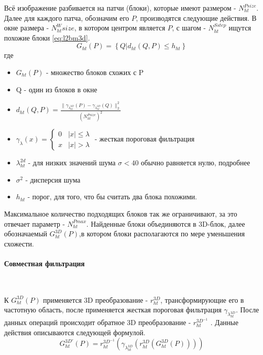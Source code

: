 Всё изображение разбивается на патчи (блоки), которые имеют размером - $N_{ht}^{Psize}$.  Далее для каждого патча, обозначим его $P$, производятся следующие действия. В окне размера - $N_{ht}^Wsize$, в котором центром является $P$, с шагом - $N_{ht}^{Sstep}$ ищутся похожие блоки  \ref{eq:l2bm3d}.
\begin{equation}\label{eq:l2bm3d}
	G_{ht}(P) = \left\{Q | d_{ht}(Q,P) \leq h_{ht}\right\}
\end{equation}
где
\begin{itemize}
	\item $G_{ht}(P)$ - множество блоков схожих с P
	\item Q - один из блоков в окне
	\item $d_{ht}(Q,P) = \frac{\parallel\gamma_{\lambda_{ht}^{2D}}(P)-\gamma_{\lambda_{ht}^{2D}}(Q)\parallel_2^2}{(N_{ht}^{Psize})^2}$
	\item $\gamma_{\lambda}(x) = \begin{cases}0 &|x| \leq \lambda\\ x & |x| > \lambda\end{cases}$ - жесткая пороговая фильтрация 
	\item $\lambda_{ht}^{2d}$ - для низких значений шума $\sigma < 40$ обычно равняется нулю, подробнее \cite{dabov}
	\item $\sigma^2$ -  дисперсия шума
	\item $h_{ht}$ - порог, для того, что бы считать два блока похожими.
\end{itemize}
Максимальное количество подходящих блоков так же ограничивают, за это отвечает параметр - $N_{ht}^{Pmax}$. Найденные блоки объединяются в 3D-блок, далее обозначаемый $G_{ht}^{3D}(P)$,в котором блоки располагаются по мере уменьшения схожести.

\paragraph{Совместная фильтрация}\

К $G_{ht}^{3D}(P)$ применяется 3D преобразование - $r_{ht}^{3D}$, трансформирующие его в частотную область, после применяется жесткая пороговая фильтрация $\gamma_{\lambda_{ht}^{3D}}$. После данных операций происходит обратное 3D преобразование - $r_{ht}^{3D^{-1}}$ . Данные действия описываются следующей формулой.
\begin{equation}
G_{ht}^{3D'}(P) = r_{ht}^{3D^{-1}}(\gamma_{\lambda_{ht}^{3D}}(r_{ht}^{3D}(G_{ht}^{3D}(P))))
\end{equation}

